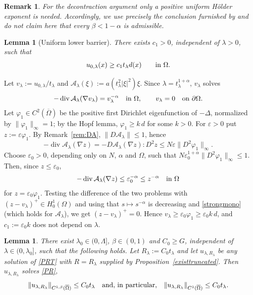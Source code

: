 \documentclass[11pt,leqno]{amsart}
\makeatletter
\newtheorem{lemma}[theorem]{Lemma}
\newtheorem{remark}[theorem]{Remark}
\renewenvironment{proof}[1][\proofname]{%
  \par
  \pushQED{\qed}%
  \normalfont
  \topsep6\p@\@plus6\p@\relax
  \trivlist
  \item[\hskip\labelsep\itshape #1\@addpunct{.}]%
  \hspace{0.5em}\ignorespaces
}{%
  \popQED
  \endtrivlist\@endpefalse
}
\makeatother
\begin{document}
\begin{remark}\label{rem:beta-not-explicit}
For the decontraction argument only a positive uniform H\"older exponent
is needed.  Accordingly, we use precisely the conclusion furnished by
\cite[Theorem B.1]{GiacomoniSchindlerTakac} and do not claim here that
every $\beta<1-\alpha$ is admissible.
\end{remark}

\begin{lemma}[Uniform lower barrier]\label{lem:lower-uniform}
There exists $c_1>0$, independent of $\lambda>0$, such that
\[
u_{0,\lambda}(x)\ge c_1t_\lambda d(x)\qquad\hbox{in }\Omega .
\]
\end{lemma}

\begin{proof}
Let $v_\lambda:=u_{0,\lambda}/t_\lambda$ and
$\mathcal A_\lambda(\xi):=a(t_\lambda^2|\xi|^2)\xi$. Since
$\lambda=t_\lambda^{1+\alpha}$, $v_\lambda$ solves
\[
-\operatorname{div}\mathcal A_\lambda(\nabla v_\lambda)=v_\lambda^{-\alpha}
\quad\hbox{in }\Omega,\qquad v_\lambda=0\quad\hbox{on }\partial\Omega .
\]
Let $\varphi_1\in C^2(\overline\Omega)$ be the positive first Dirichlet
eigenfunction of $-\Delta$, normalized by $\|\varphi_1\|_\infty=1$; by the
Hopf lemma, $\varphi_1\ge k\,d$ for some $k>0$. For $\varepsilon>0$ put
$z:=\varepsilon\varphi_1$. By Remark~\ref{rem:DA},
$\|D\mathcal A_\lambda\|\le1$, hence
\[
-\operatorname{div}\mathcal A_\lambda(\nabla z)
=-D\mathcal A_\lambda(\nabla z):D^2z
\le N\varepsilon\|D^2\varphi_1\|_\infty .
\]
Choose $\varepsilon_0>0$, depending only on $N$, $\alpha$ and $\Omega$,
such that $N\varepsilon_0^{1+\alpha}\|D^2\varphi_1\|_\infty\le1$. Then,
since $z\le\varepsilon_0$,
\[
-\operatorname{div}\mathcal A_\lambda(\nabla z)
\le\varepsilon_0^{-\alpha}\le z^{-\alpha}
\quad\hbox{in }\Omega
\]
for $z=\varepsilon_0\varphi_1$. Testing the difference of the two
problems with $(z-v_\lambda)^+\in H_0^1(\Omega)$ and using that
$s\mapsto s^{-\alpha}$ is decreasing and \eqref{strongmono} (which holds
for $\mathcal A_\lambda$), we get $(z-v_\lambda)^+=0$. Hence
$v_\lambda\ge\varepsilon_0\varphi_1\ge\varepsilon_0k\,d$, and
$c_1:=\varepsilon_0k$ does not depend on $\lambda$.
\end{proof}

\begin{lemma}\label{scaledC1}
There exist $\lambda_0\in(0,\Lambda]$, $\beta\in(0,1)$ and $C_0\ge G$,
independent of $\lambda\in(0,\lambda_0]$, such that the following holds.
Let $R_\lambda:=C_0t_\lambda$ and let $u_{\lambda,R_\lambda}$ be any
solution of \eqref{PRT} with $R=R_\lambda$ supplied by
Proposition~\ref{existtruncated}. Then $u_{\lambda,R_\lambda}$ solves
\eqref{PR},
\[
\|u_{\lambda,R_\lambda}\|_{C^{1,\beta}(\overline\Omega)}\le C_0t_\lambda
\quad\hbox{and, in particular,}\quad
\|u_{\lambda,R_\lambda}\|_{C^1(\overline\Omega)}
\le C_0t_\lambda.
\]
\end{lemma}
\end{document}

